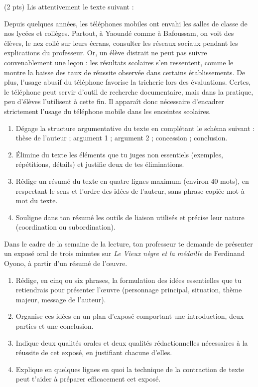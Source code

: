 \documentclass[11pt]{article}
\begin{document}
\begin{exercice} \hfill (2 pts)
Lis attentivement le texte suivant :

\og Depuis quelques années, les téléphones mobiles ont envahi les salles de classe de nos lycées et collèges. Partout, à Yaoundé comme à Bafoussam, on voit des élèves, le nez collé sur leurs écrans, consulter les réseaux sociaux pendant les explications du professeur. Or, un élève distrait ne peut pas suivre convenablement une leçon : les résultats scolaires s'en ressentent, comme le montre la baisse des taux de réussite observée dans certains établissements. De plus, l'usage abusif du téléphone favorise la tricherie lors des évaluations. Certes, le téléphone peut servir d'outil de recherche documentaire, mais dans la pratique, peu d'élèves l'utilisent à cette fin. Il apparaît donc nécessaire d'encadrer strictement l'usage du téléphone mobile dans les enceintes scolaires. \fg

\begin{enumerate}
\item Dégage la structure argumentative du texte en complétant le schéma suivant : thèse de l'auteur ; argument 1 ; argument 2 ; concession ; conclusion.
\item Élimine du texte les éléments que tu juges non essentiels (exemples, répétitions, détails) et justifie deux de tes éliminations.
\item Rédige un résumé du texte en quatre lignes maximum (environ 40 mots), en respectant le sens et l'ordre des idées de l'auteur, sans phrase copiée mot à mot du texte.
\item Souligne dans ton résumé les outils de liaison utilisés et précise leur nature (coordination ou subordination).
\end{enumerate}
\end{exercice}

\begin{exercice}
Dans le cadre de la semaine de la lecture, ton professeur te demande de présenter un exposé oral de trois minutes sur \textit{Le Vieux nègre et la médaille} de Ferdinand Oyono, à partir d'un résumé de l'œuvre.

\begin{enumerate}
\item Rédige, en cinq ou six phrases, la formulation des idées essentielles que tu retiendrais pour présenter l'œuvre (personnage principal, situation, thème majeur, message de l'auteur).
\item Organise ces idées en un plan d'exposé comportant une introduction, deux parties et une conclusion.
\item Indique deux qualités orales et deux qualités rédactionnelles nécessaires à la réussite de cet exposé, en justifiant chacune d'elles.
\item Explique en quelques lignes en quoi la technique de la contraction de texte peut t'aider à préparer efficacement cet exposé.
\end{enumerate}
\end{exercice}
\end{document}
